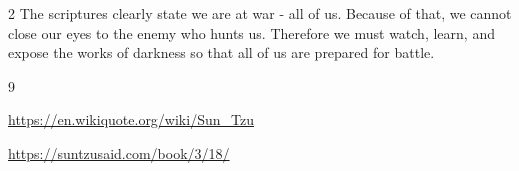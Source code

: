 \documentclass[10pt]{article}
\begin{document}
\begin{multicols}{2}
The scriptures clearly state we are at war - all of us. Because of that, we cannot close our eyes to the enemy who hunts us. Therefore we must watch, learn, and expose the works of darkness so that all of us are prepared for battle.












\begin{thebibliography}{9}
	{\footnotesize
		
	 \url{https://en.wikiquote.org/wiki/Sun_Tzu}
	
	 \url{https://suntzusaid.com/book/3/18/}
	}
\end{thebibliography}

\end{multicols}


\end{document}
